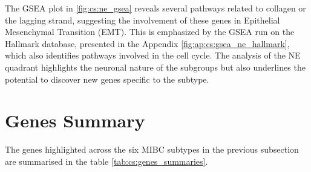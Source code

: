The GSEA plot in \cref{fig:cs:ne_gsea} reveals several pathways related to collagen or the lagging strand, suggesting the involvement of these genes in Epithelial Mesenchymal Transition (EMT). This is emphasized by the GSEA run on the Hallmark database, presented in the Appendix \cref{fig:ap:cs:gsea_ne_hallmark}, which also identifies pathways involved in the cell cycle. The analysis of the NE quadrant highlights the neuronal nature of the subgroups but also underlines the potential to discover new genes specific to the subtype. 


\section{Genes Summary} \label{s:cs:markers_summary}

The genes highlighted across the six MIBC subtypes in the previous subsection are summarised in the table \cref{tab:cs:genes_summaries}.


